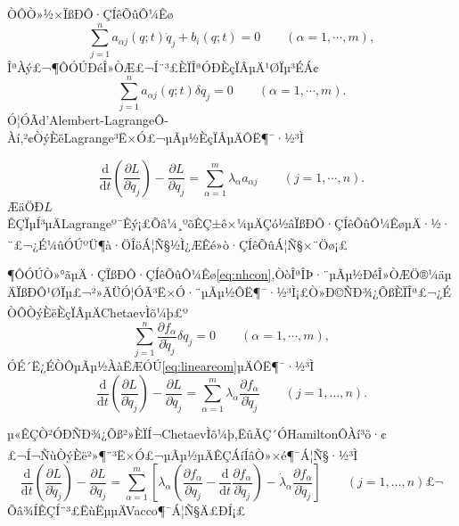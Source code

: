 \documentclass[A4,twoside]{ctexart}
\newcommand{\mathd}{\mathrm{d}}
\newcommand{\supercite}[1]{\textsuperscript{\cite{#1}}}
\begin{document}
ÒÔÒ»½×ÏßÐÔ·ÇÍêÕûÔ¼Êø
\begin{equation}
  \label{eq:linearnhcon}
    \sum_{j = 1}^n a_{\alpha j} ( q ; t) \dot{q}_j + b_i (q; t) = 0 \hspace{2em} ( \alpha =
  1, \cdots, m),
\end{equation}
ÎªÀý£¬¶ÔÓÚÐéÎ»ÒÆ£¬Í¨³£ÈÏÎªÓÐÈçÏÂµÄ¹ØÏµ³ÉÁ¢
\begin{equation}
  \label{eq:linearchetaev}
   \sum_{j = 1}^n a_{\alpha j} ( q ; t) \delta q_j = 0 \hspace{2em} ( \alpha = 1, \cdots, m).
\end{equation}
Ó¦ÓÃd'Alembert-LagrangeÔ­Àí,²¢ÒýÈëLagrange³Ë×Ó£¬µÃµ½ÈçÏÂµÄÔË¶¯·½³Ì

\begin{equation}
  \label{eq:lineareom}
    \frac{\mathd}{\mathd t} \left( \frac{\partial L}{\partial \dot{q}_j}
   \right) - \frac{\partial L}{\partial q_j} = \sum_{\alpha = 1}^m \lambda_\alpha a_{\alpha
   j} \hspace{2em} ( j = 1, \cdots, n) .
\end{equation}
ÆäÖÐ$L$ÊÇÏµÍ³µÄLagrangeº¯Êý¡£Õâ¼¸ºõÊÇ±ê×¼µÄÇó½âÏßÐÔ·ÇÍêÕûÔ¼ÊøµÄ·½·¨£¬¿É¼ûÓÚºÜ¶à·ÖÎöÁ¦Ñ§½Ì¿ÆÊé»ò·ÇÍêÕûÁ¦Ñ§×¨Öø\supercite{2,9,10}¡£

¶ÔÓÚÒ»°ãµÄ·ÇÏßÐÔ·ÇÍêÕûÔ¼Êø\eqref{eq:nhcon},ÒòÎªÎÞ·¨µÃµ½ÐéÎ»ÒÆÖ®¼äµÄÏßÐÔ¹ØÏµ£¬²»ÄÜÓ¦ÓÃ³Ë×Ó·¨µÃµ½ÔË¶¯·½³Ì¡£Ò»Ð©ÑÐ¾¿ÕßÈÏÎª£¬¿ÉÒÔÒýÈëÈçÏÂµÄChetaevÌõ¼þ\supercite{2}£º
\begin{equation}
  \label{eq:chetaev}
 \sum_{j = 1}^n \frac{\partial f_\alpha}{\partial \dot{q}_j} \delta q_j=0\hspace{2em} ( \alpha = 1, \cdots, m),
\end{equation}
ÓÉ´Ë¿ÉÒÔµÃµ½ÀàËÆÓÚ\eqref{eq:lineareom}µÄÔË¶¯·½³Ì
\begin{equation}
  \label{eq:leom}
    \frac{\mathd}{\mathd t} \left( \frac{\partial L}{\partial \dot{q}_j}
   \right) - \frac{\partial L}{\partial q_j} = \sum_{\alpha = 1}^m \lambda_\alpha \frac{\partial f_\alpha}{\partial \dot{q}_j} \hspace{2em} ( j = 1, \ldots, n) .
\end{equation}

µ«ÊÇÒ²ÓÐÑÐ¾¿Õß²»ÈÏÍ¬ChetaevÌõ¼þ,ËûÃÇ´ÓHamiltonÔ­Àí³ö·¢£¬Í¬ÑùÒýÈë²»¶¨³Ë×Ó£¬µÃµ½µÄÊÇÁíÍâÒ»×é¶¯Á¦Ñ§·½³Ì\supercite{6}
\begin{equation}
  \label{eq:eeom}
    \frac{\mathd}{\mathd t} \left( \frac{\partial L}{\partial \dot{q}_j}
   \right) - \frac{\partial L}{\partial q_j} = \sum_{\alpha = 1}^m\left[ \lambda_\alpha \left(\frac{\partial f_\alpha}{\partial q_j}-\frac{\mathd}{\mathd t} \frac{\partial f_\alpha}{\partial \dot{q}_j}\right)-\dot{\lambda}_\alpha \frac{\partial f_\alpha}{\partial \dot{q}_j}\right] \hspace{2em} ( j = 1, \ldots, n) £¬
\end{equation}
Õâ¾ÍÊÇÍ¨³£ËùËµµÄVacco¶¯Á¦Ñ§Ä£ÐÍ¡£
\end{document}
